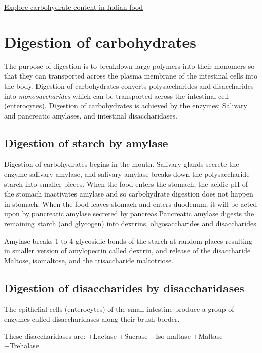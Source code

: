 \documentclass[
]{book}
\begin{document}
\href{padmanaban55.github.io/CarbohydrateContent}{Explore carbohydrate content in Indian food}

\section{Digestion of carbohydrates}\label{digestion-of-carbohydrates}

The purpose of digestion is to breakdown large polymers into their monomers so that they can transported across the plasma membrane of the intestinal cells into the body. Digestion of carbohydrates converts polysaccharides and disaccharides into \emph{monosaccharides} which can be transported across the intestinal cell (enterocytes). Digestion of carbohydrates is achieved by the enzymes; Salivary and pancreatic amylases, and intestinal disaccharidases.

\subsection{Digestion of starch by amylase}\label{digestion-of-starch-by-amylase}

Digestion of carbohydrates begins in the mouth. Salivary glands secrete the enzyme salivary amylase, and salivary amylase breaks down the polysaccharide starch into smaller pieces. When the food enters the stomach, the acidic pH of the stomach inactivates amylase and so carbohydrate digestion does not happen in stomach. When the food leaves stomach and enters duodenum, it will be acted upon by pancreatic amylase secreted by pancreas.Pancreatic amylase digests the remaining starch (and glycogen) into dextrins, oligosaccharides and disaccharides.

Amylase breaks 1 to 4 glycosidic bonds of the starch at random places resulting in smaller version of amylopectin called dextrin, and release of the disaccharide Maltose, isomaltose, and the trisaccharide maltotriose.

\subsection{Digestion of disaccharides by disaccharidases}\label{digestion-of-disaccharides-by-disaccharidases}

The epithelial cells (enterocytes) of the small intestine produce a group of enzymes called disaccharidases along their brush border.

These disaccharidases are:
+Lactase
+Sucrase
+Iso-maltase
+Maltase
+Trehalase
\end{document}
